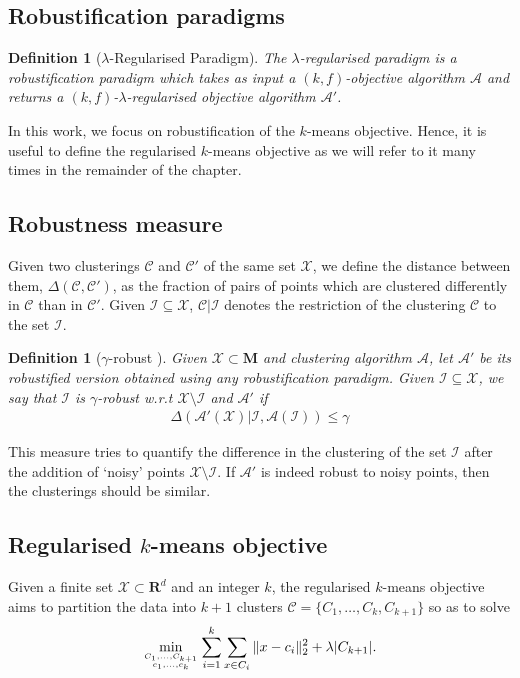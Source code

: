 \documentclass[12pt]{article}
\newcommand{\mc}{\mathcal}
\newcommand{\mb}{\mathbf}
\newtheorem{definition}[theorem]{Definition}
\begin{document}
\subsection{Robustification paradigms}
\begin{definition}[$\lambda$-Regularised Paradigm] The $\lambda$-regularised paradigm is a robustification paradigm which takes as input a $(k, f)$-objective algorithm $\mc A$ and returns a $(k, f)$-$\lambda$-regularised objective algorithm $\mc A'$.  
\end{definition}

In this work, we focus on robustification of the $k$-means objective. Hence, it is useful to define the regularised $k$-means objective as we will refer to it many times in the remainder of the chapter. 

\subsection{Robustness measure}
Given two clusterings $\mc C$ and $\mc C'$ of the same set $\mc X$, we define the distance between them, $\Delta(\mc C, \mc C')$, as the fraction of pairs of points which are clustered differently in $\mc C$ than in $\mc C'$. 
Given $\mc I \subseteq \mc X$, $\mc C|\mc I$ denotes the restriction of the clustering $\mc C$ to the set $\mc I$.

\begin{definition}[$\gamma$-robust \cite{ben2014clustering}]
Given $\mc X\subset \mb M$ and clustering algorithm $\mc A$, let $\mc A'$ be its robustified version obtained using any robustification paradigm. Given $\mc I \subseteq \mc X$, we say that $\mc I$ is $\gamma$-robust w.r.t $\mc X \setminus \mc I$ and $\mc A'$ if 
\begin{align}
\Delta(\mc A'(\mc X)|\mc I, \mc A(\mc I)) \le \gamma
\end{align}
\end{definition}
This measure tries to quantify the difference in the clustering of the set $\mc I$ after the addition of `noisy' points $\mc X \setminus \mc I$. If $\mc A'$ is indeed robust to noisy points, then the clusterings should be similar. 

\subsection{Regularised $k$-means objective}
Given a finite set $\mc X \subset \mb R^{d}$ and an integer $k$, the regularised $k$-means objective aims to partition the data into $k+1$ clusters $\mc C = \{C_1, \ldots, C_{k}, C_{k+1}\}$ so as to solve 
\begin{align}
	\min_{C_1,\ldots, C_{k+1} \atop c_1, \ldots, c_k} \sum_{i=1}^k \sum_{x \in C_i} \|x-c_i\|_2^2 + \lambda |C_{k+1}|.
	\label{eqn:modifiedkmeans}
\end{align}
\end{document}
